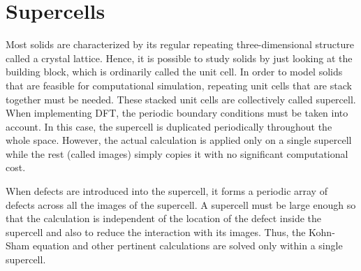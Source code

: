 \section{Supercells}
Most solids are characterized by its regular repeating three-dimensional structure called a crystal lattice. Hence, it is possible to study solids by just looking at the building block, which is ordinarily called the unit cell. In order to model solids that are feasible for computational simulation, repeating unit cells that are stack together must be needed. These  stacked unit cells  are collectively called supercell. When implementing DFT, the periodic boundary conditions must be taken into account. In this case, the supercell is duplicated periodically throughout the whole space. However, the actual calculation is applied only on a single supercell while the rest (called images) simply copies it with no significant computational cost. 

When defects are introduced into the supercell, it forms a periodic array of defects across all the images of the supercell. A supercell must be large enough so that the calculation is independent of the location of the defect inside the supercell and also to reduce  the interaction  with its images. Thus, the Kohn-Sham equation and other pertinent calculations are solved only within  a single supercell.



